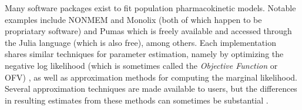 Many software packages exist to fit population pharmacokinetic models.  Notable examples  include NONMEM \cite{bauer2011nonmem} and Monolix \cite{noauthor_monolix_nodate} (both of which happen to be propriatary software) and Pumas \cite{rackauckas2020accelerated} which is freely available and accessed through the Julia language (which is also free), among others.  Each implementation shares similar techniques for parameter estimation, namely by optimizing the negative log likelihood (which is sometimes called the \textit{Objective Function} or OFV) \cite{bauer2011nonmem, mould2013basic, bauer_nonmem_2019}, as well as approximation methods for computing the marginal likelihood.  Several approximation techniques are made available to users, but the differences in resulting estimates from these methods can sometimes be substantial \cite{mould2013basic}.